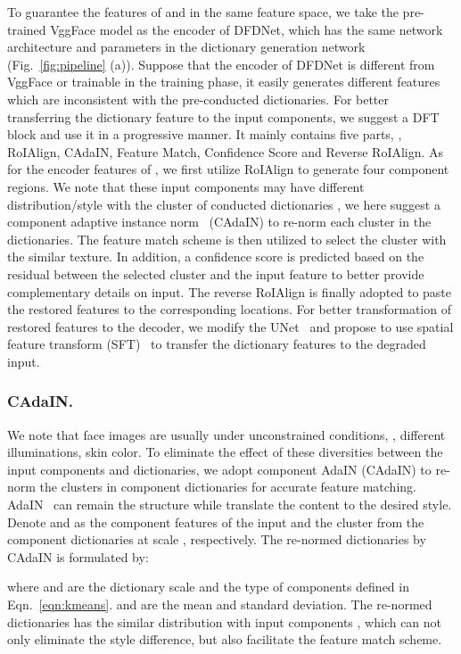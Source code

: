 \documentclass[runningheads]{llncs}
\begin{document}
To guarantee the features of  and  in the same feature space, we take the pre-trained VggFace model as the encoder of DFDNet, which has the same network architecture and parameters in the dictionary generation network (Fig.~\ref{fig:pipeline} (a)). Suppose that the encoder of DFDNet is different from VggFace or trainable in the training phase, it easily generates different features which are inconsistent with the pre-conducted dictionaries.
For better transferring the dictionary feature to the input components, we suggest a DFT block and use it in a progressive manner. It mainly contains five parts, \ie, RoIAlign, CAdaIN, Feature Match, Confidence Score and Reverse RoIAlign. As for the encoder features of , we first utilize RoIAlign to generate four component regions. We note that these input components may have different distribution/style with the cluster of conducted dictionaries , we here suggest a component adaptive instance norm~\cite{huang2017arbitrary} (CAdaIN) to re-norm each cluster in the dictionaries. The feature match scheme is then utilized to select the cluster with the similar texture. In addition, a confidence score is predicted based on the residual between the selected cluster and the input feature to better provide complementary details on input. The reverse RoIAlign is finally adopted to paste the restored features to the corresponding locations. For better transformation of restored features to the decoder, we modify the UNet~\cite{ronneberger2015u} and propose to use spatial feature transform (SFT)~\cite{wang2018recovering} to transfer the dictionary features to the degraded input.
\subsubsection{CAdaIN.} 
We note that face images are usually under unconstrained conditions, \eg, different illuminations, skin color. To eliminate the effect of these diversities between the input components and dictionaries, we adopt component AdaIN (CAdaIN) to re-norm the clusters in component dictionaries for accurate feature matching. AdaIN~\cite{huang2017arbitrary} can remain the structure while translate the content to the desired style. Denote  and  as the  component features of the input  and the  cluster from the component dictionaries at scale , respectively. The re-normed dictionaries  by CAdaIN is formulated by:

where  and  are the dictionary scale and the type of components defined in Eqn.~\ref{eqn:kmeans}.  and  are the mean and standard deviation. The re-normed dictionaries  has the similar distribution with input components , 
which can not only eliminate the style difference, but also facilitate the feature match scheme.
\end{document}
